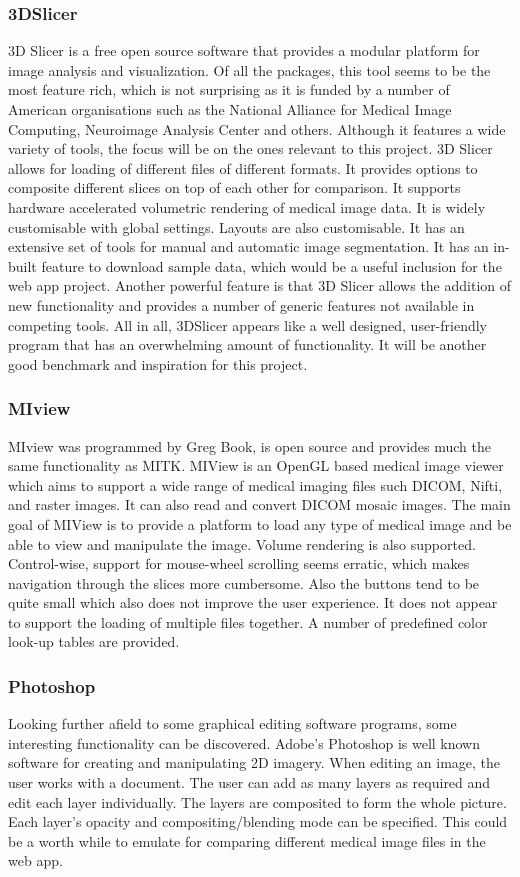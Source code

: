 \documentclass[a4paper,11pt,titlepage]{article}
\begin{document}
\subsubsection{3DSlicer}
3D Slicer is a free open source software that provides a modular platform for image analysis and visualization. Of all the packages, this tool seems to be the most feature rich, which is not surprising as it is funded by a number of American organisations such as  the National Alliance for Medical Image Computing, Neuroimage Analysis Center and others. Although it features a wide variety of tools, the focus will be on the ones relevant to this project. 3D Slicer allows for loading of different files of different formats. It provides options to composite different slices on top of each other for comparison. It supports hardware accelerated volumetric rendering of medical image data. It is widely customisable with global settings. Layouts are also customisable. It has an extensive set of tools for manual and automatic image segmentation. It has an in-built feature to download sample data, which would be a useful inclusion for the web app project. Another powerful feature is that 3D Slicer allows the addition of new functionality and provides a number of generic features not available in competing tools. All in all, 3DSlicer appears like a well designed, user-friendly program that has an overwhelming amount of functionality. It will be another good benchmark and inspiration for this project.

\subsubsection{MIview}
MIview was programmed by Greg Book, is open source and provides much the same functionality as MITK. MIView is an OpenGL based medical image viewer which aims to support a wide range of medical imaging files such DICOM, Nifti, and raster images. It can also read and convert DICOM mosaic images. The main goal of MIView is to provide a platform to load any type of medical image and be able to view and manipulate the image. Volume rendering is also supported. Control-wise, support for mouse-wheel scrolling seems erratic, which makes navigation through the slices more cumbersome. Also the buttons tend to be quite small which also does not improve the user experience. It does not appear to support the loading of multiple files together. A number of predefined color look-up tables are provided.

\subsubsection{Photoshop}
Looking further afield to some graphical editing software programs, some interesting functionality can be discovered. Adobe's Photoshop is well known software for creating and manipulating 2D imagery. When editing an image, the user works with a document. The user can add as many layers as required and edit each layer individually. The layers are composited to form the whole picture. Each layer's opacity and compositing/blending mode can be specified. This could be a worth while to emulate for comparing different medical image files in the web app.
\end{document}
